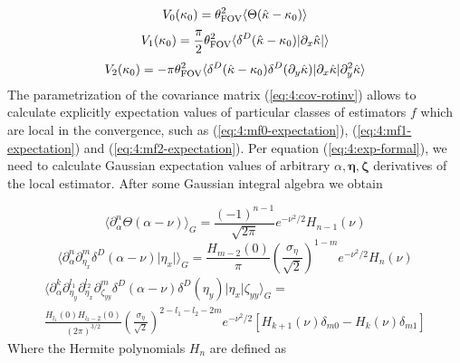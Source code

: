 \begin{equation}
\label{eq:4:mf0-expectation}
V_0(\kappa_0) = \theta_{\rm FOV}^2\langle\Theta(\hat{\kappa}-\kappa_0)\rangle
\end{equation} 
%
\begin{equation}
\label{eq:4:mf1-expectation}
V_1(\kappa_0) = \frac{\pi}{2}\theta_{\rm FOV}^2\langle\delta^D(\hat{\kappa}-\kappa_0)\vert\partial_x\hat{\kappa}\vert\rangle
\end{equation} 
%
\begin{equation}
\label{eq:4:mf2-expectation}
V_2(\kappa_0) = -\pi\theta_{\rm FOV}^2\langle\delta^D(\hat{\kappa}-\kappa_0)\delta^D(\partial_y\hat{\kappa})\vert\partial_x\hat{\kappa}\vert\partial^2_y\hat{\kappa}\rangle
\end{equation}
%
The parametrization of the covariance matrix (\ref{eq:4:cov-rotinv}) allows to calculate explicitly expectation values of particular classes of estimators $f$ which are local in the convergence, such as (\ref{eq:4:mf0-expectation}), (\ref{eq:4:mf1-expectation}) and (\ref{eq:4:mf2-expectation}). Per equation (\ref{eq:4:exp-formal}), we need to calculate Gaussian expectation values of arbitrary $\alpha,\pmb{\eta},\pmb{\zeta}$ derivatives of the local estimator. After some Gaussian integral algebra we obtain

\begin{equation}
\label{eq:4:Rv0}
\langle\partial_\alpha^n\Theta(\alpha-\nu)\rangle_G = \frac{(-1)^{n-1}}{\sqrt{2\pi}}e^{-\nu^2/2}H_{n-1}(\nu) 
\end{equation}
%
\begin{equation}
\label{eq:4:Rv1}
\langle\partial_\alpha^n\partial_{\eta_x}^m\delta^D(\alpha-\nu)\vert\eta_x\vert\rangle_G = \frac{H_{m-2}(0)}{\pi}\left(\frac{\sigma_\eta}{\sqrt{2}}\right)^{1-m}e^{-\nu^2/2}H_n(\nu) 
\end{equation} 
%
\hfill
\begin{equation}
\label{eq:4:Rv2}
\begin{gathered}
\langle\partial_\alpha^k\partial_{\eta_y}^{l_1}\partial_{\eta_x}^{l_2}\partial_{\zeta_{yy}}^m\delta^D(\alpha-\nu)\delta^D(\eta_y)\vert\eta_x\vert\zeta_{yy}\rangle_G = \\
\frac{H_{l_1}(0)H_{l_2-2}(0)}{(2\pi)^{3/2}}\left(\frac{\sigma_\eta}{\sqrt{2}}\right)^{2-l_1-l_2-2m}e^{-\nu^2/2}[H_{k+1}(\nu)\delta_{m0}-H_k(\nu)\delta_{m1}]
\end{gathered} 
\end{equation} 
%
Where the Hermite polynomials $H_n$ are defined as 

